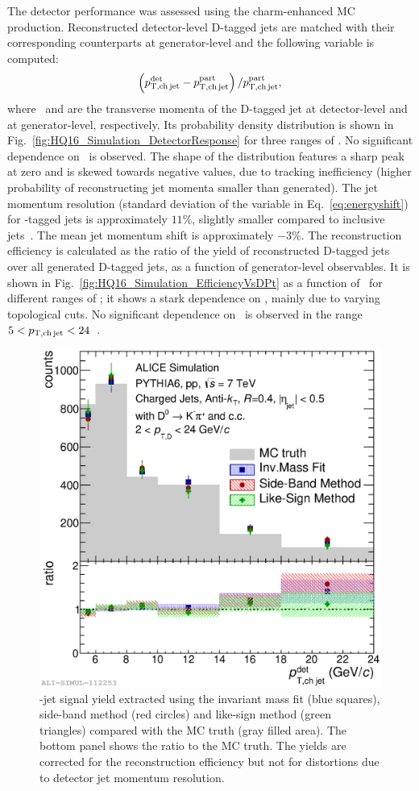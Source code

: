 \documentclass[a4paper]{jpconf}
\begin{document}
The detector performance was assessed using the charm-enhanced MC production. 
Reconstructed detector-level D-tagged jets are matched with their corresponding counterparts at generator-level and the following variable is computed:
\begin{equation}
\left( p_{\mathrm{T,ch\,jet}}^{\mathrm{det}} - p_{\mathrm{T,ch\,jet}}^{\mathrm{part}} \right) / p_{\mathrm{T,ch\,jet}}^{\mathrm{part}},
\label{eq:energyshift}
\end{equation}
where \ptchjetdet\ and \ptchjetgen are the transverse momenta of the D-tagged jet at detector-level and at generator-level, respectively.
Its probability density distribution is shown in Fig.~\ref{fig:HQ16_Simulation_DetectorResponse} for three ranges of \ptchjetgen. No significant dependence on \ptchjetgen\ is observed.
The shape of the distribution features a sharp peak at zero and is skewed towards negative values, due to tracking inefficiency (higher probability of
reconstructing jet momenta smaller than generated). The jet momentum resolution (standard deviation of the variable in Eq.~\ref{eq:energyshift}) for \Dzero-tagged jets is approximately \mbox{$11$\%}, 
slightly smaller compared to inclusive jets~\cite{ALICE:2015e}. The mean jet momentum shift is approximately \mbox{$-3$\%}.
The reconstruction efficiency is calculated as the ratio of the yield of reconstructed D-tagged jets over all generated D-tagged jets, as a function of generator-level observables.
It is shown in Fig.~\ref{fig:HQ16_Simulation_EfficiencyVsDPt} as a function of \ptd\ for different ranges of \ptchjet; it shows a stark dependence on \ptd, mainly due to
varying topological cuts. No significant dependence on \ptchjet\ is observed in the range $5<p_{\mathrm{T,ch\, jet}}<24$~\GeVc.

\begin{figure}[tb]
\includegraphics[width=.50\textwidth]{img/HQ16_Simulation_MethodComparison}\hspace{1pc}%
\begin{minipage}[b]{.50\textwidth}\caption{\label{fig:HQ16_Simulation_MethodComparison}\Dzero-jet signal yield extracted using the invariant mass fit (blue squares), side-band method (red circles) and like-sign method (green triangles)
compared with the MC truth (gray filled area). The bottom panel shows the ratio to the MC truth. The yields are corrected for the reconstruction efficiency but not for distortions due to detector jet momentum resolution.}
\end{minipage}
\end{figure}
\end{document}
